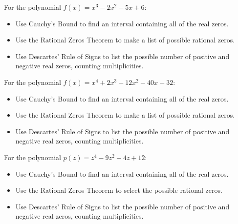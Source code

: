 \documentclass{ximera}
\begin{document}
	\author{Stitz-Zeager}

\begin{problem}\label{prelimpolystufffirst}
For the polynomial $f(x) = x^{3} - 2x^{2} - 5x + 6$:

\begin{itemize}
\item  Use Cauchy's Bound to find an interval containing all of the real zeros.
\item  Use the Rational Zeros Theorem to make a list of possible rational zeros.
\item  Use Descartes' Rule of Signs to list the possible number of positive and negative real zeros, counting multiplicities.
\end{itemize}
\end{problem}

\begin{problem}
For the polynomial $f(x) = x^{4} + 2x^{3} - 12x^{2} - 40x - 32$:

\begin{itemize}
\item  Use Cauchy's Bound to find an interval containing all of the real zeros.
\item  Use the Rational Zeros Theorem to make a list of possible rational zeros.
\item  Use Descartes' Rule of Signs to list the possible number of positive and negative real zeros, counting multiplicities.
\end{itemize}
\end{problem}

\begin{problem}
For the polynomial $p(z) = z^{4} - 9z^{2} - 4z + 12$:

\begin{itemize}
\item  Use Cauchy's Bound to find an interval containing all of the real zeros.
\item  Use the Rational Zeros Theorem to select the possible rational zeros.
\begin{selectAll}
  \end{selectAll}
\item  Use Descartes' Rule of Signs to list the possible number of positive and negative real zeros, counting multiplicities.
\end{itemize}
\end{problem}
\end{document}
